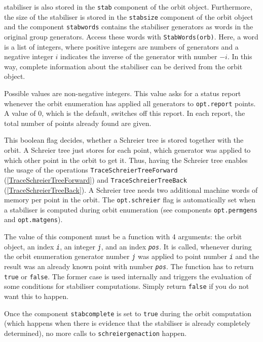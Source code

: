 \documentclass[a4paper,11pt]{report}
\begin{document}
{{{\begin{description}
stabiliser is also stored in the \texttt{stab} component of the orbit object. Furthermore, the size of the stabiliser is
stored in the \texttt{stabsize} component of the orbit object and the component \texttt{stabwords} contains the stabiliser generators as words in the original group generators.
Access these words with \texttt{StabWords(orb)}. Here, a word is a list of integers, where positive integers are numbers of
generators and a negative integer $i$ indicates the inverse of the generator with number $-i$. In this way, complete information about the stabiliser can be derived from
the orbit object. 
\item[{\texttt{report}}] Possible values are non-negative integers. This value asks for a status report
whenever the orbit enumeration has applied all generators to \texttt{opt.report} points. A value of $0$, which is the default, switches off this report. In each report, the total
number of points already found are given.
\item[{\texttt{schreier}}] This boolean flag decides, whether a Schreier tree is stored together with the
orbit. A Schreier tree just stores for each point, which generator was applied
to which other point in the orbit to get it. Thus, having the Schreier tree
enables the usage of the operations \texttt{TraceSchreierTreeForward} (\ref{TraceSchreierTreeForward}) and \texttt{TraceSchreierTreeBack} (\ref{TraceSchreierTreeBack}). A Schreier tree needs two additional machine words of memory per point in
the orbit. The \texttt{opt.schreier} flag is automatically set when a stabiliser is computed during orbit
enumeration (see components \texttt{opt.permgens} and \texttt{opt.matgens}).
\item[{\texttt{schreiergenaction}}] The value of this component must be a function with 4 arguments: the orbit
object, an index \mbox{\texttt{\mdseries\slshape i}}, an integer \mbox{\texttt{\mdseries\slshape j}}, and an index \mbox{\texttt{\mdseries\slshape pos}}. It is called, whenever during the orbit enumeration generator number \mbox{\texttt{\mdseries\slshape j}} was applied to point number \mbox{\texttt{\mdseries\slshape i}} and the result was an already known point with number \mbox{\texttt{\mdseries\slshape pos}}. The function has to return \texttt{true} or \texttt{false}. The former case is used internally and triggers the evaluation of some
conditions for stabiliser computations. Simply return \texttt{false} if you do not want this to happen. 

 Once the component \texttt{stabcomplete} is set to \texttt{true} during the orbit computation (which happens when there is evidence that the
stabiliser is already completely determined), no more calls to \texttt{schreiergenaction} happen. 


\end{description}}}}
\end{document}
